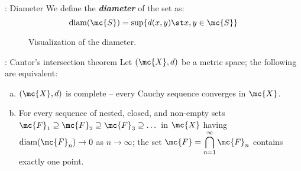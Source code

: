 \begin{ndef}{: Diameter}
	We define the \emph{\textbf{diameter}} of the set as:
	\begin{equation*}
		\text{diam}(\mc{S})=\sup\{d(x,y)\st x,y\in\mc{S}\}
	\end{equation*}
\end{ndef}

\begin{figure}[htbp]
	\centering
	
	\caption{Visualization of the diameter.}
\end{figure}

\begin{ntheorem}{: Cantor's intersection theorem}
	Let \((\mc{X},d)\) be a metric space; the following are equivalent:
	\begin{enumerate}[(a)]
		\item \((\mc{X},d)\) is complete -- every Cauchy sequence converges in \(\mc{X}\).
		
		\item For every sequence of nested, closed, and non-empty sets \(\mc{F}_1\supseteq\mc{F}_2\supseteq\mc{F}_3\supseteq\dots\) in \(\mc{X}\) having \(\text{diam}(\mc{F}_n)\to 0\) as \(n\to\infty\); the set \(\mc{F}=\displaystyle\bigcap_{n=1}^{\infty}\mc{F}_n\) contains exactly one point.
	\end{enumerate}
\end{ntheorem}


